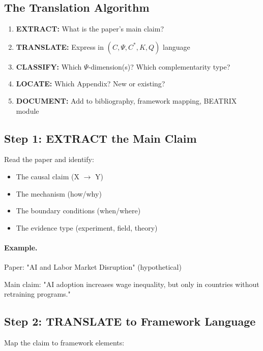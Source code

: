 \subsection{The Translation Algorithm}

\begin{tcolorbox}[colback=blue!5!white, colframe=blue!50!black, title=Five-Step Integration]
\begin{enumerate}
  \item \textbf{EXTRACT:} What is the paper's main claim?
  \item \textbf{TRANSLATE:} Express in $(C, \Psi, C^*, K, Q)$ language
  \item \textbf{CLASSIFY:} Which $\Psi$-dimension(s)? Which complementarity type?
  \item \textbf{LOCATE:} Which Appendix? New or existing?
  \item \textbf{DOCUMENT:} Add to bibliography, framework mapping, BEATRIX module
\end{enumerate}
\end{tcolorbox}

\subsection{Step 1: EXTRACT the Main Claim}

Read the paper and identify:
\begin{itemize}
  \item The causal claim (X $\to$ Y)
  \item The mechanism (how/why)
  \item The boundary conditions (when/where)
  \item The evidence type (experiment, field, theory)
\end{itemize}

\paragraph{Example.}
Paper: "AI and Labor Market Disruption" (hypothetical)

Main claim: "AI adoption increases wage inequality, but only in countries without 
retraining programs."

\subsection{Step 2: TRANSLATE to Framework Language}

Map the claim to framework elements:

